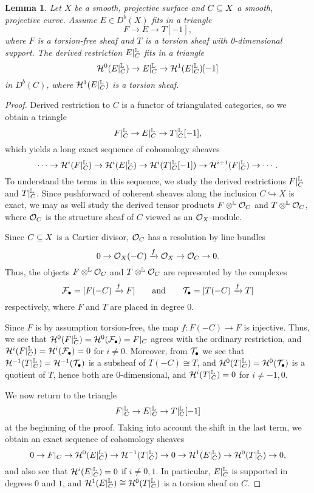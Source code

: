 \documentclass[letterpaper,12pt]{amsart}
\newtheorem{lem}[thm]{Lemma}
\theoremstyle{remark}
\begin{document}
\begin{lem}\label{restsingle} 
    Let $X$ be a smooth, projective surface and $C \subseteq X$ a smooth, projective curve. Assume $E \in D^b(X)$ fits in a triangle
    \[ F \to E \to T[-1], \]
    where $F$ is a torsion-free sheaf and $T$ is a torsion sheaf with 0-di\-men\-sion\-al support. The derived restriction $E|_C^{\mathbb{L}}$ fits in a triangle
    \[ \mathcal{H}^0(E|_C^{\mathbb{L}}) \to E|_C^{\mathbb{L}} \to \mathcal{H}^1(E|_C^{\mathbb{L}})[-1] \]
    in $D^b(C)$, where $\mathcal{H}^1(E|_C^{\mathbb{L}})$ is a torsion sheaf.
\end{lem}
\begin{proof}
Derived restriction to $C$ is a functor of triangulated categories, so we obtain a triangle
\[ F|_C^{\mathbb{L}} \to E|_C^{\mathbb{L}} \to T|_C^{\mathbb{L}}[-1], \]
which yields a long exact sequence of cohomology sheaves
\[ \cdots \to \mathcal{H}^i(F|_C^{\mathbb{L}}) \to \mathcal{H}^i(E|_C^{\mathbb{L}}) \to \mathcal{H}^i(T|_C^{\mathbb{L}}[-1]) \to \mathcal{H}^{i+1}(F|_C^{\mathbb{L}}) \to \cdots. \]
To understand the terms in this sequence, we study the derived restrictions $F|_C^{\mathbb{L}}$ and $T|_C^{\mathbb{L}}$. Since pushforward of coherent sheaves along the inclusion $C \hookrightarrow X$ is exact, we may as well study the derived tensor products $F \otimes^{\mathbb{L}} \mathcal{O}_C$ and $T \otimes^{\mathbb{L}} \mathcal{O}_C$, where $\mathcal{O}_C$ is the structure sheaf of $C$ viewed as an $\mathcal{O}_X$-module. 

Since $C \subseteq X$ is a Cartier divisor, $\mathcal{O}_C$ has a resolution by line bundles
\[ 0 \to \mathcal{O}_X(-C) \xrightarrow{f} \mathcal{O}_X \to \mathcal{O}_C \to 0. \]
Thus, the objects $F \otimes^{\mathbb{L}} \mathcal{O}_C$ and $T \otimes^{\mathbb{L}} \mathcal{O}_C$ are represented by the complexes
\[ \mathcal{F}_\bullet = [F(-C) \xrightarrow{f} F] \qquad \mathrm{and} \qquad \mathcal{T}_\bullet = [T(-C) \xrightarrow{f} T] \]
respectively, where $F$ and $T$ are placed in degree 0. 

Since $F$ is by assumption torsion-free, the map $f: F(-C) \to F$ is injective. Thus, we see that $\mathcal{H}^0(F|_C^{\mathbb{L}}) = \mathcal{H}^0(\mathcal{F}_\bullet) = F|_C$ agrees with the ordinary restriction, and $\mathcal{H}^i(F|_C^{\mathbb{L}}) = \mathcal{H}^i(\mathcal{F}_\bullet) = 0$ for $i \neq 0$. Moreover, from $\mathcal{T}_\bullet$ we see that $\mathcal{H}^{-1}(T|_C^{\mathbb{L}}) = \mathcal{H}^{-1}(\mathcal{T}_\bullet)$ is a subsheaf of $T(-C) \cong T$, and $\mathcal{H}^0(T|_C^{\mathbb{L}}) = \mathcal{H}^0(\mathcal{T}_\bullet)$ is a quotient of $T$, hence both are 0-dimensional, and $\mathcal{H}^i(T|_C^{\mathbb{L}}) = 0$ for $i \neq -1, 0$.

We now return to the triangle
\[ F|_C^{\mathbb{L}} \to E|_C^{\mathbb{L}} \to T|_C^{\mathbb{L}}[-1] \]
at the beginning of the proof. Taking into account the shift in the last term, we obtain an exact sequence of cohomology sheaves
\[ 0 \to F|_C \to \mathcal{H}^0(E|_C^{\mathbb{L}}) \to \mathcal{H}^{-1}(T|_C^{\mathbb{L}}) \to 0 \to \mathcal{H}^1(E|_C^{\mathbb{L}}) \to \mathcal{H}^0(T|_C^{\mathbb{L}}) \to 0, \]
and also see that $\mathcal{H}^i(E|_C^{\mathbb{L}}) = 0$ if $i \neq 0,1$. In particular, $E|_C^{\mathbb{L}}$ is supported in degrees $0$ and $1$, and $\mathcal{H}^1(E|_C^{\mathbb{L}}) \cong \mathcal{H}^0(T|_C^{\mathbb{L}})$ is a torsion sheaf on $C$.
\end{proof}
\end{document}
